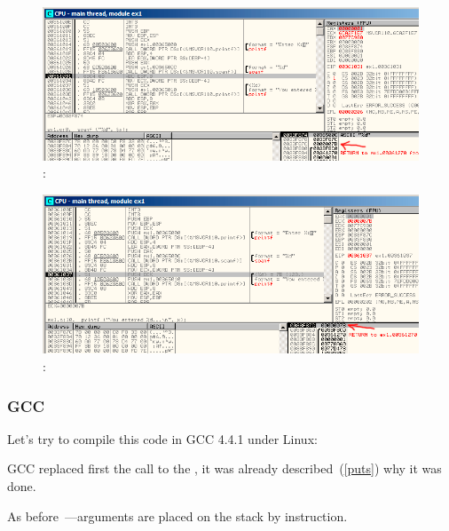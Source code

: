 \begin{figure}[H]
\centering
\includegraphics[scale=0.66]{patterns/04_scanf/ex1_olly_3.png}
\caption{\olly: \scanf {}}
\label{fig:scanf_ex1_olly_3}
\end{figure}

\begin{figure}[H]
\centering
\includegraphics[scale=0.66]{patterns/04_scanf/ex1_olly_4.png}
\caption{\olly:  \printf}
\label{fig:scanf_ex1_olly_4}
\end{figure}

\subsubsection{GCC}

{Let's try to compile this code in GCC 4.4.1 under Linux:}



{GCC replaced first the \printf call to the \puts, it was already described~(\ref{puts})
why it was done.}


{As before~---arguments are placed on the stack by \MOV instruction.}
